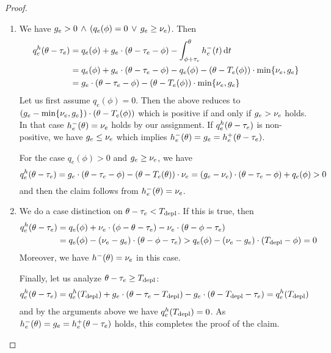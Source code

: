 \begin{proof}
\begin{enumerate}[label=\textbf{Case \Roman*.}, wide=0.5em]
        \item We have $g_e > 0 \,\land\, \left( q_e(\phi) = 0 \,\lor\, g_e \geq \capa_e \right)$.
        Then \begin{align*}
            q_e^h(\theta - \transit_e) &= q_e(\phi) + g_e \cdot (\theta - \transit_e - \phi) - \int_{\phi + \transit_e}^{\theta} \outfl[h]_e(t)\diff t \\
            &= q_e(\phi) + g_e\cdot (\theta - \transit_e - \phi) - q_e(\phi) - (\theta - T_e(\phi))\cdot \min\{\capa_e, g_e\} \\
            &= g_e\cdot(\theta -\transit_e - \phi) - (\theta - T_e(\phi))\cdot \min\{\capa_e, g_e\}
        \end{align*}
        Let us first assume $q_e(\phi) = 0$.
        Then the above reduces to $(g_e - \min\{\capa_e,g_e\})\cdot (\theta - T_e(\phi))$ which is positive if and only if $g_e > \capa_e$ holds.
        In that case $\outfl[h]_e(\theta) = \capa_e$ holds by our assignment.
        If $q_e^h(\theta - \transit_e)$ is non-positive, we have $g_e \leq \capa_e$ which implies $\outfl[h]_e(\theta) = g_e = \infl[h]_e(\theta - \transit_e)$.

        For the case $q_e(\phi) > 0$ and $g_e \geq \capa_e$, we have \[
            q_e^h(\theta - \transit_e) = g_e\cdot(\theta - \transit_e - \phi) - (\theta - T_e(\theta)) \cdot \capa_e = (g_e - \capa_e) \cdot (\theta - \transit_e - \phi) + q_e(\phi) > 0
        \]
        and then the claim follows from $\outfl[h]_e(\theta) = \capa_e$.

        \item We do a case distinction on $\theta - \transit_e < T_{\depl}$.
        If this is true, then \begin{align*}
            q^h_e (\theta - \transit_e)
            &= q_e(\phi) + \capa_e\cdot (\phi-\theta-\transit_e) - \capa_e\cdot (\theta - \phi - \transit_e)\\
            &= q_e(\phi) - (\capa_e - g_e) \cdot (\theta - \phi - \transit_e)
            > q_e(\phi) - (\capa_e - g_e) \cdot (T_{\depl} - \phi) = 0
        \end{align*}
        Moreover, we have $\outfl[h](\theta) = \capa_e$ in this case.

        Finally, let us analyze $\theta - \transit_e \geq T_{\depl}$:
        \begin{align*}
            q^h_e (\theta - \transit_e)
            &= q^h_e(T_{\depl}) + g_e \cdot (\theta - \transit_e - T_{\depl}) - g_e \cdot (\theta - T_{\depl} - \transit_e) = q^h_e(T_{\depl})
        \end{align*}
        and by the arguments above we have $q^h_e(T_{\depl}) = 0$.
        As $\outfl[h]_e(\theta) = g_e = \infl[h]_e(\theta - \transit_e)$ holds, this completes the proof of the claim.
    \end{enumerate}


\end{proof}
